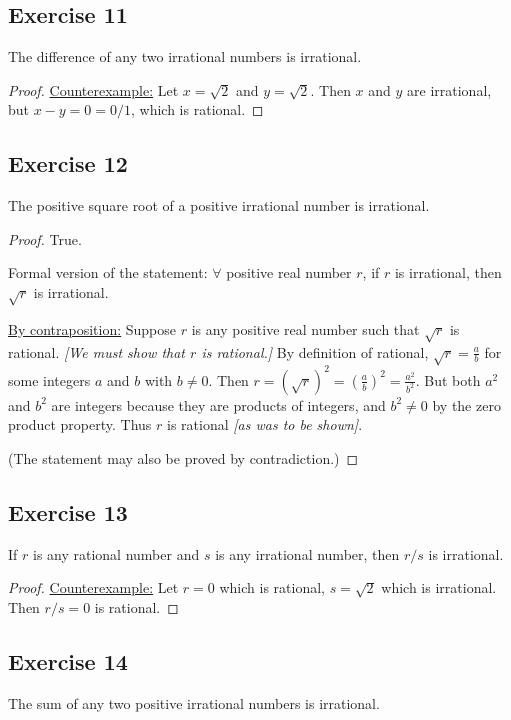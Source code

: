 \documentclass[14pt]{extarticle}
\newcommand{\fa}{\forall}
\begin{document}
\subsection{Exercise 11}
The difference of any two irrational numbers is irrational.

\begin{proof}
\underline{Counterexample:} Let $x = \sqrt{2}$ and $y = \sqrt{2}$. Then $x$ and $y$ are irrational, but $x - y = 0  = 0/1$, which is rational.
\end{proof}

\subsection{Exercise 12}
The positive square root of a positive irrational number is irrational.

\begin{proof}
True.

Formal version of the statement: $\fa$ positive real number
$r$, if $r$ is irrational, then $\sqrt{r}$ is irrational.

\underline{By contraposition:} Suppose $r$ is any positive real number such that $\sqrt{r}$ is rational. {\it [We must show that $r$ is rational.]} By definition of rational, $\sqrt{r} = \frac{a}{b}$ for some integers $a$ and $b$ with $b \neq 0$. Then $r = (\sqrt{r})^2 = \left(\frac{a}{b}\right)^2 = \frac{a^2}{b^2}$. But both $a^2$ and $b^2$ are integers because they are products of integers, and $b^2 \neq 0$ by the zero product property. Thus $r$ is rational {\it [as was to be shown]}. 

(The statement may also be proved by contradiction.)
\end{proof}

\subsection{Exercise 13}
If \(r\) is any rational number and $s$ is any irrational number, then $r/s$ is irrational.

\begin{proof}
\underline{Counterexample:} Let $r = 0$ which is rational, $s = \sqrt{2}$ which is irrational. Then $r / s = 0$ is rational.
\end{proof}

\subsection{Exercise 14}
The sum of any two positive irrational numbers is irrational.
\end{document}
